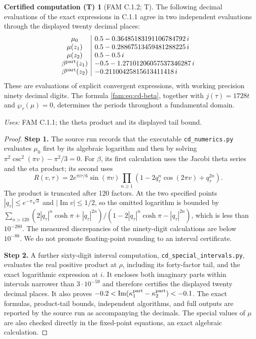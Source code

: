 \documentclass[11pt,a4paper]{article}
\theoremstyle{plain}
\theoremstyle{definition}
\newtheorem{computed}[theorem]{Certified computation (T)}
\begin{document}
\begin{computed}[FAM C.1.2; T]\label{fam:C.1.2}
The following decimal evaluations of the exact expressions in C.1.1 agree
in two independent evaluations through the displayed twenty decimal places:
\[
\begin{array}{c|l}
\mu_0&0.5-0.36485183191106784792\,i\\
\mu(z_1)&0.5-0.28867513459481288225\,i\\
\mu(z_2)&0.5-0.5\,i\\
\beta^{\rm part}(z_1)&-0.5-1.27101206057537346287\,i\\
\beta^{\rm part}(z_2)&-0.21100425815613411418\,i
\end{array}
\]
These are evaluations of explicit convergent expressions, with working
precision ninety decimal digits. The formula \eqref{fam:eq:cd-beta}, together
with \(j(\tau)=1728t\) and \(\wp_\tau(\mu)=0\), determines the periods
throughout a fundamental domain.
\end{computed}
\noindent\textit{Uses:} FAM C.1.1; the theta product and its displayed tail bound.\par
\begin{proof}
\noindent\textbf{Step 1.} The source run records that the executable \texttt{cd\_numerics.py} evaluates \(\mu_0\) first by its
algebraic logarithm and then by solving
\(\pi^2\csc^2(\pi v)-\pi^2/3=0\). For \(\beta\), its first calculation uses
the Jacobi theta series and the eta product; its second uses
\[
 R(v,\tau)=2e^{\pi i\tau/6}\sin(\pi v)
 \prod_{n\geq1}(1-2q_\tau^n\cos(2\pi v)+q_\tau^{2n}).
\]
The product is truncated after 120 factors. At the two specified points
\(|q_\tau|\leq e^{-\pi\sqrt3}\) and \(|\operatorname{Im}v|\leq1/2\), so the
omitted logarithm is bounded by
\(\sum_{n>120}(2|q_\tau|^n\cosh\pi+|q_\tau|^{2n})/(1-2|q_\tau|^n\cosh\pi-|q_\tau|^{2n})\),
which is less than \(10^{-280}\). The measured discrepancies of the
ninety-digit calculations are below \(10^{-88}\). We do not promote floating-point rounding to an interval certificate.


\noindent\textbf{Step 2.} 
A further sixty-digit interval computation, \texttt{cd\_special\_intervals.py},
evaluates the real positive product at $\rho$, including its forty-factor
tail, and the exact logarithmic expression at $i$. It encloses both
imaginary parts within intervals narrower than $3\cdot10^{-59}$ and
therefore certifies the displayed twenty decimal places. It also proves
$-0.2<\operatorname{Im}(\kappa_1^{\rm part}-\kappa_2^{\rm part})<-0.1$.
The exact formulas, product-tail bounds, independent algorithms, and
full outputs are reported by the source run as accompanying the decimals. The special values of \(\mu\) are also checked directly in
the fixed-point equations, an exact algebraic calculation.
\end{proof}
\end{document}
